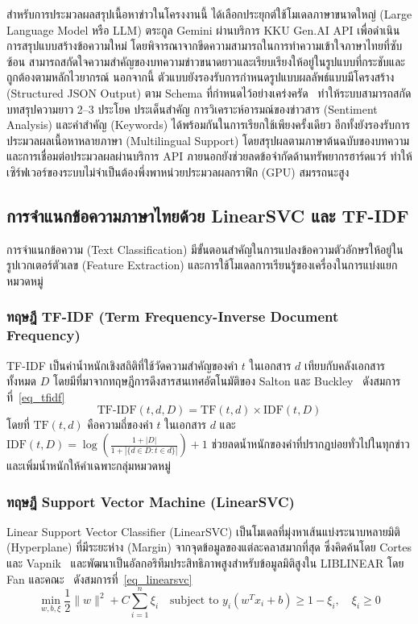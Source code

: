 สำหรับการประมวลผลสรุปเนื้อหาข่าวในโครงงานนี้ ได้เลือกประยุกต์ใช้โมเดลภาษาขนาดใหญ่ (Large Language Model หรือ LLM) ตระกูล Gemini ผ่านบริการ KKU Gen.AI API \parencite{gemini2024} เพื่อดำเนินการสรุปแบบสร้างข้อความใหม่ โดยพิจารณาจากขีดความสามารถในการทำความเข้าใจภาษาไทยที่ซับซ้อน สามารถสกัดใจความสำคัญของบทความข่าวขนาดยาวและเรียบเรียงให้อยู่ในรูปแบบที่กระชับและถูกต้องตามหลักไวยากรณ์ นอกจากนี้ ตัวแบบยังรองรับการกำหนดรูปแบบผลลัพธ์แบบมีโครงสร้าง (Structured JSON Output) ตาม Schema ที่กำหนดไว้อย่างเคร่งครัด~\parencite{openai2024} ทำให้ระบบสามารถสกัดบทสรุปความยาว 2--3 ประโยค ประเด็นสำคัญ การวิเคราะห์อารมณ์ของข่าวสาร (Sentiment Analysis) และคำสำคัญ (Keywords) ได้พร้อมกันในการเรียกใช้เพียงครั้งเดียว อีกทั้งยังรองรับการประมวลผลเนื้อหาหลายภาษา (Multilingual Support) โดยสรุปผลตามภาษาต้นฉบับของบทความ และการเชื่อมต่อประมวลผลผ่านบริการ API ภายนอกยังช่วยลดข้อจำกัดด้านทรัพยากรฮาร์ดแวร์ ทำให้เซิร์ฟเวอร์ของระบบไม่จำเป็นต้องพึ่งพาหน่วยประมวลผลกราฟิก (GPU) สมรรถนะสูง

\subsection{การจำแนกข้อความภาษาไทยด้วย LinearSVC และ TF-IDF}

การจำแนกข้อความ (Text Classification) มีขั้นตอนสำคัญในการแปลงข้อความตัวอักษรให้อยู่ในรูปเวกเตอร์ตัวเลข (Feature Extraction) และการใช้โมเดลการเรียนรู้ของเครื่องในการแบ่งแยกหมวดหมู่

\subsubsection{ทฤษฎี TF-IDF (Term Frequency-Inverse Document Frequency)}
TF-IDF เป็นค่าน้ำหนักเชิงสถิติที่ใช้วัดความสำคัญของคำ $t$ ในเอกสาร $d$ เทียบกับคลังเอกสารทั้งหมด $D$ โดยมีที่มาจากทฤษฎีการดึงสารสนเทศอัตโนมัติของ Salton และ Buckley~\parencite{salton1988,manning2008} ดังสมการที่~\eqref{eq_tfidf}
\begin{equation}
\label{eq_tfidf}
\text{TF-IDF}(t, d, D) = \text{TF}(t, d) \times \text{IDF}(t, D)
\end{equation}
โดยที่ $\text{TF}(t, d)$ คือความถี่ของคำ $t$ ในเอกสาร $d$ และ $\text{IDF}(t, D) = \log\left(\frac{1 + |D|}{1 + |\{d \in D : t \in d\}|}\right) + 1$ ช่วยลดน้ำหนักของคำที่ปรากฏบ่อยทั่วไปในทุกข่าว และเพิ่มน้ำหนักให้คำเฉพาะกลุ่มหมวดหมู่

\subsubsection{ทฤษฎี Support Vector Machine (LinearSVC)}
Linear Support Vector Classifier (LinearSVC) เป็นโมเดลที่มุ่งหาเส้นแบ่งระนาบหลายมิติ (Hyperplane) ที่มีระยะห่าง (Margin) จากจุดข้อมูลของแต่ละคลาสมากที่สุด ซึ่งคิดค้นโดย Cortes และ Vapnik~\parencite{cortes1995} และพัฒนาเป็นอัลกอริทึมประสิทธิภาพสูงสำหรับข้อมูลมิติสูงใน LIBLINEAR โดย Fan และคณะ~\parencite{fan2008liblinear} ดังสมการที่~\eqref{eq_linearsvc}
\begin{equation}
\label{eq_linearsvc}
\min_{w, b, \xi} \frac{1}{2} \|w\|^2 + C \sum_{i=1}^n \xi_i \quad \text{subject to } y_i (w^T x_i + b) \ge 1 - \xi_i, \quad \xi_i \ge 0
\end{equation}

